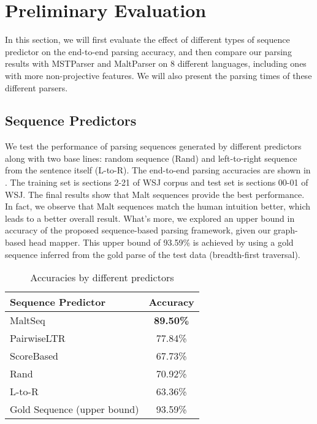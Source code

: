 \section{Preliminary Evaluation}

In this section, we will first evaluate the effect of different types of
sequence predictor on the end-to-end parsing accuracy, and then compare
our parsing results with MSTParser and MaltParser on 8 different languages,
including ones with more non-projective features. We will also present the
parsing times of these different parsers.


\subsection{Sequence Predictors}
We test the performance of parsing sequences generated by
different predictors along with two base lines: random sequence (Rand) and
left-to-right sequence from the sentence itself (L-to-R).
The end-to-end parsing accuracies are shown in .
The training set is sections 2-21 of WSJ corpus and test set is sections 
00-01 of WSJ.  The final results show that Malt sequences provide 
the best performance. 
In fact, we observe that Malt sequences match the human intuition better,
which leads to a better overall result.
What's more, we explored an upper bound in accuracy of the proposed
sequence-based parsing framework, given our graph-based head mapper.
This upper bound of 93.59\% is achieved by using a gold sequence inferred from 
the gold parse of the test data (breadth-first traversal). 
\begin{table}[ht]
\small
  \centering
  \caption{Accuracies by different predictors}
    \begin{tabular}{lc}
    \toprule
    Sequence Predictor & Accuracy \\
    \midrule
    MaltSeq & \bf{89.50}\% \\
    PairwiseLTR & 77.84\% \\
    ScoreBased & 67.73\% \\
    Rand  & 70.92\% \\
    L-to-R & 63.36\% \\
    Gold Sequence (upper bound) & 93.59\% \\
    \bottomrule
    \end{tabular}%
  \label{tab:seqtest}%
\end{table}%

